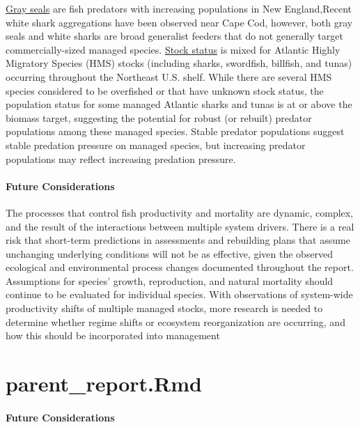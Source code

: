 \documentclass[
  10pt,
]{article}
\begin{document}
\href{https://noaa-edab.github.io/catalog/grayseal.html}{Gray seals} are fish predators with increasing populations in New England,Recent white shark aggregations have been observed near Cape Cod, however, both gray seals and white sharks are broad generalist feeders that do not generally target commercially-sized managed species. \href{https://noaa-edab.github.io/catalog/hms_stock_status.html}{Stock status} is mixed for Atlantic Highly Migratory Species (HMS) stocks (including sharks, swordfish, billfish, and tunas) occurring throughout the Northeast U.S. shelf. While there are several HMS species considered to be overfished or that have unknown stock status, the population status for some managed Atlantic sharks and tunas is at or above the biomass target, suggesting the potential for robust (or rebuilt) predator populations among these managed species. Stable predator populations suggest stable predation pressure on managed species, but increasing predator populations may reflect increasing predation pressure.

\paragraph{Future Considerations}\label{future-considerations-2}

The processes that control fish productivity and mortality are dynamic, complex, and the result of the interactions between multiple system drivers. There is a real risk that short-term predictions in assessments and rebuilding plans that assume unchanging underlying conditions will not be as effective, given the observed ecological and environmental process changes documented throughout the report. Assumptions for species' growth, reproduction, and natural mortality should continue to be evaluated for individual species. With observations of system-wide productivity shifts of multiple managed stocks, more research is needed to determine whether regime shifts or ecosystem reorganization are occurring, and how this should be incorporated into management

\section{parent\_report.Rmd}\label{parent_report.rmd-7}

\paragraph{Future Considerations}\label{future-considerations-3}
\end{document}
